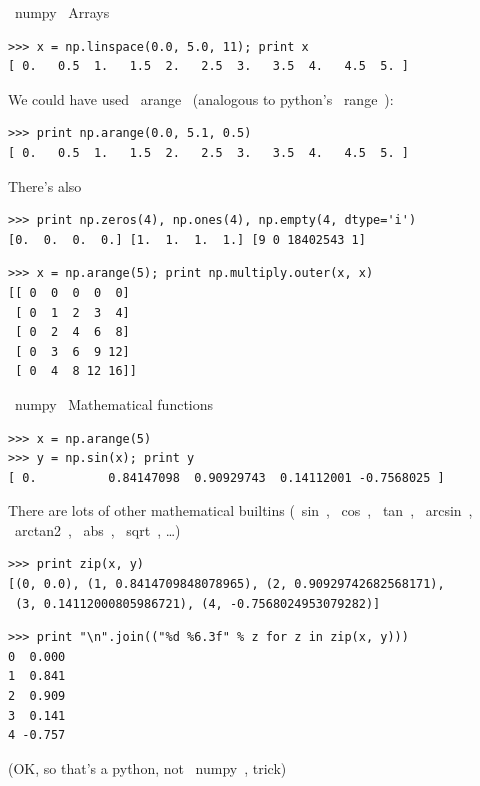 \documentclass[10pt, t]{beamer}
\let\verb=\codeDelimTwiddles
\begin{document}
\begin{frame}[fragile,label=sec-3-27]{\verb~numpy~ Arrays}
 \pause
\lstset{language=Python,label= ,caption= ,numbers=none}
\begin{lstlisting}
>>> x = np.linspace(0.0, 5.0, 11); print x
[ 0.   0.5  1.   1.5  2.   2.5  3.   3.5  4.   4.5  5. ]
\end{lstlisting}
\pause
We could have used \verb~arange~ (analogous to python's \verb~range~):
\lstset{language=Python,label= ,caption= ,numbers=none}
\begin{lstlisting}
>>> print np.arange(0.0, 5.1, 0.5)
[ 0.   0.5  1.   1.5  2.   2.5  3.   3.5  4.   4.5  5. ]
\end{lstlisting}
\pause
There's also
\lstset{language=Python,label= ,caption= ,numbers=none}
\begin{lstlisting}
>>> print np.zeros(4), np.ones(4), np.empty(4, dtype='i')
[0.  0.  0.  0.] [1.  1.  1.  1.] [9 0 18402543 1]
\end{lstlisting}
\pause
\lstset{language=Python,label= ,caption= ,numbers=none}
\begin{lstlisting}
>>> x = np.arange(5); print np.multiply.outer(x, x)
[[ 0  0  0  0  0]
 [ 0  1  2  3  4]
 [ 0  2  4  6  8]
 [ 0  3  6  9 12]
 [ 0  4  8 12 16]]
\end{lstlisting}
\end{frame}
\begin{frame}[fragile,label=sec-3-28]{\verb~numpy~ Mathematical functions}
 \pause
\lstset{language=Python,label= ,caption= ,numbers=none}
\begin{lstlisting}
>>> x = np.arange(5)
>>> y = np.sin(x); print y
[ 0.          0.84147098  0.90929743  0.14112001 -0.7568025 ]
\end{lstlisting}
There are lots of other mathematical builtins (\verb~sin~, \verb~cos~, \verb~tan~, \verb~arcsin~, \verb~arctan2~, \verb~abs~, \verb~sqrt~, \ldots{})
\pause
\lstset{language=Python,label= ,caption= ,numbers=none}
\begin{lstlisting}
>>> print zip(x, y)
[(0, 0.0), (1, 0.8414709848078965), (2, 0.90929742682568171),
 (3, 0.14112000805986721), (4, -0.7568024953079282)]
\end{lstlisting}
\pause
\lstset{language=Python,label= ,caption= ,numbers=none}
\begin{lstlisting}
>>> print "\n".join(("%d %6.3f" % z for z in zip(x, y)))
0  0.000
1  0.841
2  0.909
3  0.141
4 -0.757
\end{lstlisting}
(OK, so that's a python, not \verb~numpy~, trick)
\end{frame}
\end{document}
